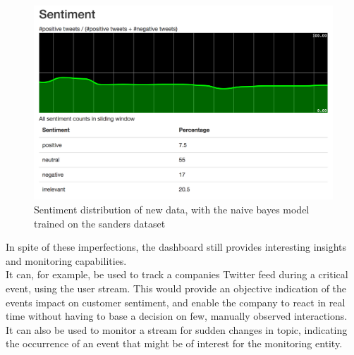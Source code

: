 \begin{figure}
    \centering
    \caption{Sentiment distribution of new data, with the naive bayes model trained on the sanders dataset}
    \label{fig:sample_sentiment_distribtion_new}
    \includegraphics[width=\textwidth]{../images/dashboard_sentiment_sample.png}
\end{figure}

\par
In spite of these imperfections, the dashboard still provides interesting insights and monitoring capabilities.
\\
It can, for example, be used to track a companies Twitter feed during a critical event, using the user stream.
This would provide an objective indication of the events impact on customer sentiment,
and enable the company to react in real time without having to base a decision on few, manually observed interactions.
\\
It can also be used to monitor a stream for sudden changes in topic,
indicating the occurrence of an event that might be of interest for the monitoring entity.